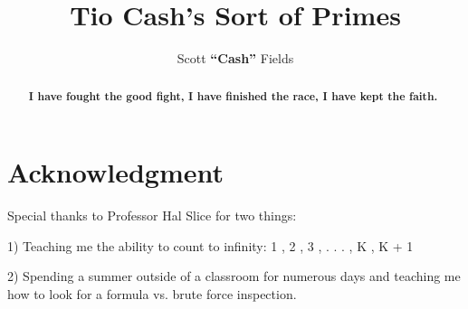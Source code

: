 \documentclass[12pt,letterpaper,oneside,titlepage]{article}
\begin{document}
\author{Scott \textbf{``Cash''} Fields}
\title{Tio Cash's Sort of Primes}
\maketitle





\begin{abstract}

	\textbf{ I have fought the good fight, I have finished the race, I have kept the faith.}

\end{abstract}	
\pagebreak






\section*{Acknowledgment}

Special thanks to Professor Hal Slice for two things:
\newline
\par
1) Teaching me the ability to count to infinity:
\hfill
\newline
\hspace*{12mm} 1 , 2 , 3 , . . . , K , K + 1
\newline
\par
2) Spending a summer outside of a classroom for numerous days and teaching
me how to
\newline
\hspace*{12mm} look for a formula vs. brute force inspection.


\pagebreak


\tableofcontents



	
\end{document}
